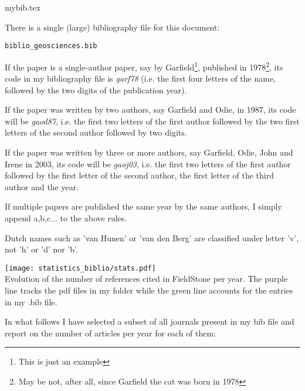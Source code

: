 \begin{flushright} {\tiny {\color{gray} mybib.tex}} \end{flushright}

There is a single (large) bibliography file for this document:
\begin{center}
{\tt biblio\_geosciences.bib}
\end{center}

If the paper is a single-author paper, say by Garfield\footnote{This is just an example}, 
published in 1978\footnote{May be not, after all, since Garfield the cat was born in 1978}, its code 
in my bibliography file is {\sl garf78} (i.e. the first four letters of the name, followed by 
the two digits of the publication year).

If the paper was written by two authors, say Garfield and Odie, in 1987, its code 
will be {\sl gaod87}, i.e. the first two letters of the first author followed by the two 
first letters of the second author followed by two digits.

If the paper was written by three or more authors, say Garfield, Odie, John and Irene in 
2003, its code will be {\sl gaoj03}, i.e. the first two letters of the first author followed 
by the first letter of the second author, the first letter of the third author and the year.

If multiple papers are published the same year by the same authors, I simply append a,b,c... to the 
above rules. 

\begin{remark} Dutch names such as 'van Hunen' or 'van den Berg' are classified under letter 'v', 
not 'h' or 'd' nor 'b'. 
\end{remark}

\vspace{1cm}

\begin{center}
\texttt{[image: statistics\_biblio/stats.pdf]}\\
{\captionfont Evolution of the number of references cited in FieldStone
per year. The purple line tracks the pdf files in my folder while 
the green line accounts for the entries in my .bib file.}
\end{center}

In what follows I have selected a subset of all journals present in 
my bib file and report on the number of articles per year for each of them:

